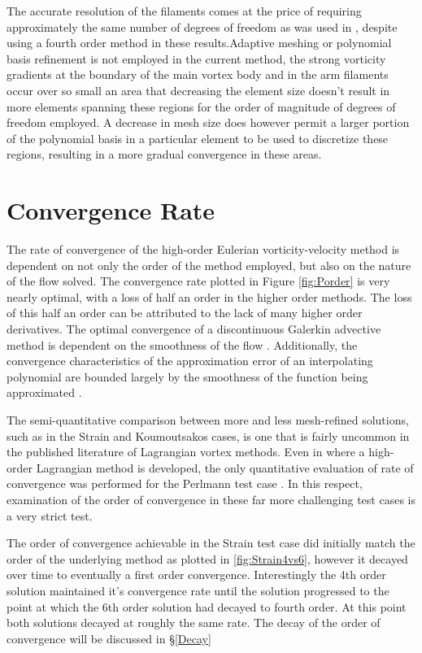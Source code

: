\documentclass[letterpaper,12pt]{report}
\begin{document}
The accurate resolution of the filaments comes at the price of requiring approximately the same number of degrees of freedom as was used in \cite{Koum1997}, despite using a fourth order method in these results.Adaptive meshing or polynomial basis refinement is not employed in the current method, the strong vorticity gradients at the boundary of the main vortex body and in the arm filaments occur over so small an area that decreasing the element size doesn't result in more elements spanning these regions for the order of magnitude of degrees of freedom employed. A decrease in mesh size does however permit a larger portion of the polynomial basis in a particular element to be used to discretize these regions, resulting in a more gradual convergence in these areas.

\section{Convergence Rate}
The rate of convergence of the high-order Eulerian vorticity-velocity method is dependent on not only the order of the method employed, but also on the nature of the flow solved. The convergence rate plotted in Figure \ref{fig:Porder} is very nearly optimal, with a loss of half an order in the higher order methods. The loss of this half an order can be attributed to the lack of many higher order derivatives. The optimal convergence of a discontinuous Galerkin advective method is dependent on the smoothness of the flow \cite{HestWar}. Additionally, the convergence characteristics of the approximation error of an interpolating polynomial are bounded largely by the smoothness of the function being approximated \cite{Roni}.

The semi-quantitative comparison between more and less mesh-refined solutions, such as in the Strain and Koumoutsakos cases, is one that is fairly uncommon in the published literature of Lagrangian vortex methods. Even in \cite{Strain1996} where a high-order Lagrangian method is developed, the only quantitative evaluation of rate of convergence was performed for the Perlmann test case \cite{Perlmann1985}. In this respect, examination of the order of convergence in these far more challenging test cases is a very strict test.

The order of convergence achievable in the Strain test case did initially match the order of the underlying method as plotted in \ref{fig:Strain4vs6}, however it decayed over time to eventually a first order convergence. Interestingly the 4th order solution maintained it's convergence rate until the solution progressed to the point at which the 6th order solution had decayed to fourth order. At this point both solutions decayed at roughly the same rate. The decay of the order of convergence will be discussed in \S\ref{Decay}
\end{document}
